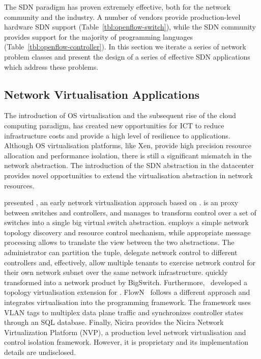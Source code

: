The SDN paradigm has proven extremely effective, both for the network community
and the industry. A number of vendors provide production-level hardware SDN
support (Table~\ref{tbl:openflow-switch}), while the SDN community provides \of
support for the majority of programming languages
(Table~\ref{tbl:openflow-controller}).  In this section we iterate a series of
network problem classes and present the design of a series of effective SDN
applications which address these problems.

\subsection{Network Virtualisation Applications}

The introduction of OS virtualisation and the subsequent rise of the cloud
computing paradigm, has created new opportunities for ICT to reduce
infrastructure costs and provide a high level of resilience to applications.
Although OS virtualisation platforms, like Xen, provide high precision resource
allocation and performance isolation, there is still a significant mismatch in
the network abstraction.  The introduction of the SDN abstraction in the
datacenter provides novel opportunities to extend the virtualisation abstraction
in network resources. 

 presented \flv, an early network virtualisation approach
based on \of.  \flv is an \of proxy between switches and controllers,
and manages to transform control over a set of switches into a single big
virtual switch abstraction.  \flv employs a simple network topology discovery
and resource control mechanism, while appropriate message processing allows to
translate the view between the two abstractions.  The administrator can
partition the \of tuple, delegate network control to different controllers and,
effectively, allow multiple tenants to exercise network control for their own
network subnet over the same network infrastructure.  \flv quickly
transformed into a network product by BigSwitch. Furthermore,
~developed a topology virtualisation extension for \flv.
FlowN~ follows a different approach and integrates
virtualisation into the  programming framework.  The framework uses VLAN tags to
multiplex data plane traffic and synchronizes controller states through an SQL
database. Finally, Nicira provides the Nicira Network Virtualization Platform
(NVP), a production level network virtualisation and control isolation
framework. However, it is proprietary and its implementation details are
undisclosed. 

